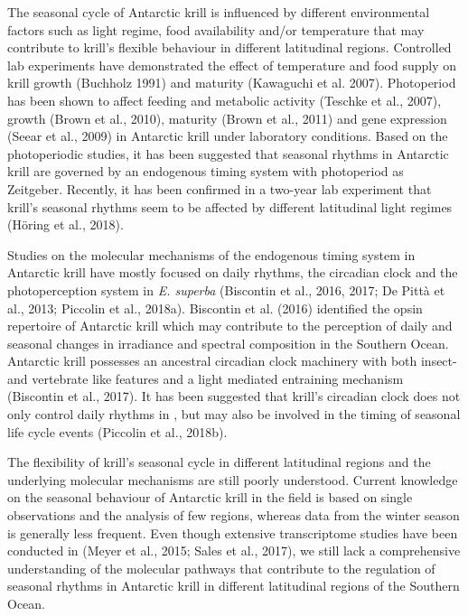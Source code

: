 The seasonal cycle of Antarctic krill is influenced by different environmental
factors such as light regime, food availability and/or temperature that may
contribute to krill's flexible behaviour in different latitudinal regions.
Controlled lab experiments have demonstrated the effect of temperature and food
supply on krill growth (Buchholz 1991) and maturity (Kawaguchi et al. 2007).
Photoperiod has been shown to affect feeding and metabolic activity (Teschke et
al., 2007), growth (Brown et al., 2010), maturity (Brown et al., 2011) and gene
expression (Seear et al., 2009) in Antarctic krill under laboratory conditions.
Based on the photoperiodic studies, it has been suggested that seasonal rhythms
in Antarctic krill are governed by an endogenous timing system with photoperiod
as Zeitgeber. Recently, it has been confirmed in a two-year lab experiment that
krill's seasonal rhythms seem to be affected by different latitudinal light
regimes (Höring et al., 2018).

Studies on the molecular mechanisms of the endogenous timing system in
Antarctic krill have mostly focused on daily rhythms, the circadian clock and
the photoperception system in \textit{E. superba}  (Biscontin et al., 2016,
2017; De Pittà et al., 2013; Piccolin et al., 2018a). Biscontin et al. (2016)
identified the opsin repertoire of Antarctic krill which may contribute to the
perception of daily and seasonal changes in irradiance and spectral composition
in the Southern Ocean. Antarctic krill possesses an ancestral circadian clock
machinery with both insect- and vertebrate like features and a light mediated
entraining mechanism (Biscontin et al., 2017). It has been suggested that
krill's circadian clock does not only control daily rhythms in , but may also be involved in the timing of seasonal life cycle events
(Piccolin et al., 2018b).

The flexibility of krill's seasonal cycle in different latitudinal regions and
the underlying molecular mechanisms are still poorly understood. Current
knowledge on the seasonal behaviour of Antarctic krill in the field is based on
single observations and the analysis of few regions, whereas data from the
winter season is generally less frequent. Even though extensive transcriptome
studies have been conducted in  (Meyer et al., 2015; Sales et
al., 2017), we still lack a comprehensive understanding of the molecular
pathways that contribute to the regulation of seasonal rhythms in Antarctic
krill in different latitudinal regions of the Southern Ocean. 


